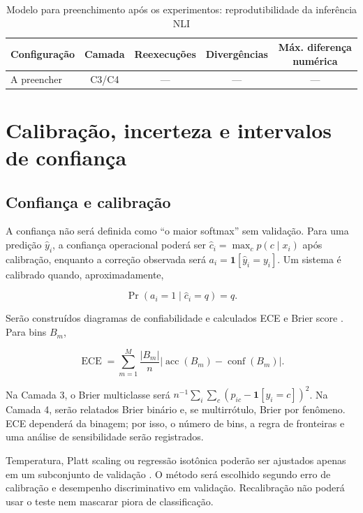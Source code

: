\begin{table}[htbp]
\centering
\caption{Modelo para preenchimento após os experimentos: reprodutibilidade da inferência NLI}
\label{tab:resultados-reexecucao}
\begin{tabular}{|l|c|c|c|c|}
\hline
\textbf{Configuração} & \textbf{Camada} & \textbf{Reexecuções} & \textbf{Divergências} & \textbf{Máx. diferença numérica} \\
\hline
A preencher & C3/C4 & --- & --- & --- \\
\hline
\end{tabular}
\end{table}

\section{Calibração, incerteza e intervalos de confiança}

\subsection{Confiança e calibração}

A confiança não será definida como ``o maior softmax'' sem validação. Para uma predição \(\widehat y_i\), a confiança operacional poderá ser \(\widehat c_i=\max_c p(c\mid x_i)\) após calibração, enquanto a correção observada será \(a_i=\mathbf{1}[\widehat y_i=y_i]\). Um sistema é calibrado quando, aproximadamente,

\[
\Pr(a_i=1\mid \widehat c_i=q)=q.
\]

Serão construídos diagramas de confiabilidade e calculados ECE e Brier score \cite{brier1950,guo2017calibration}. Para bins \(B_m\),

\[
\operatorname{ECE}=\sum_{m=1}^{M}\frac{|B_m|}{n}
\left|\operatorname{acc}(B_m)-\operatorname{conf}(B_m)\right|.
\]

Na Camada 3, o Brier multiclasse será \(n^{-1}\sum_i\sum_c(p_{ic}-\mathbf{1}[y_i=c])^2\). Na Camada 4, serão relatados Brier binário e, se multirrótulo, Brier por fenômeno. ECE dependerá da binagem; por isso, o número de bins, a regra de fronteiras e uma análise de sensibilidade serão registrados.

Temperatura, Platt scaling ou regressão isotônica poderão ser ajustados apenas em um subconjunto de validação \cite{zadroznyelkan2002}. O método será escolhido segundo erro de calibração e desempenho discriminativo em validação. Recalibração não poderá usar o teste nem mascarar piora de classificação.

